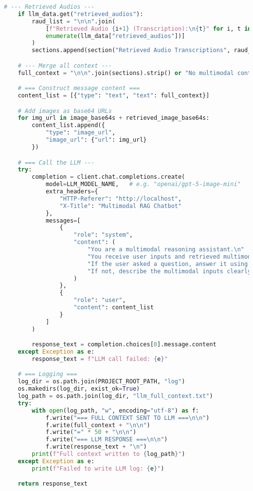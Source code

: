 \documentclass{article}
\begin{document}
\begin{latin}
\begin{lstlisting}[language=Python]
    # --- Retrieved Audios ---
    if llm_data.get("retrieved_audios"):
        raud_list = "\n\n".join(
            [f"Retrieved Audio {i+1} (Transcription):\n{t}" for i, t in
            enumerate(llm_data["retrieved_audios"])]
        )
        sections.append(section("Retrieved Audio Transcriptions", raud_list))

    # --- Merge all context ---
    full_context = "\n\n".join(sections).strip() or "No multimodal content provided."

    # === Construct message content ===
    content_list = [{"type": "text", "text": full_context}]

    # Add images as base64 URLs
    for img_url in image_base64s + retrieved_image_base64s:
        content_list.append({
            "type": "image_url",
            "image_url": {"url": img_url}
        })

    # === Call the LLM ---
    try:
        completion = client.chat.completions.create(
            model=LLM_MODEL_NAME, 	# e.g. "openai/gpt-5-image-mini"
            extra_headers={
                "HTTP-Referer": "http://localhost",
                "X-Title": "Multimodal RAG Chatbot"
            },
            messages=[
                {
                    "role": "system",
                    "content": (
                        "You are a multimodal reasoning assistant.\n"
                        "You receive user inputs and retrieved multimodal data (text, image, audio).\n"
                        "If the user asked a question, answer it using relevant data.\n"
                        "If not, describe the multimodal inputs clearly in Markdown."
                    )
                },
                {
                    "role": "user",
                    "content": content_list
                }
            ]
        )

        response_text = completion.choices[0].message.content
    except Exception as e:
        response_text = f"LLM call failed: {e}"

    # === Logging ===
    log_dir = os.path.join(PROJECT_ROOT_PATH, "log")
    os.makedirs(log_dir, exist_ok=True)
    log_path = os.path.join(log_dir, "llm_full_context.txt")
    try:
        with open(log_path, "w", encoding="utf-8") as f:
            f.write("=== FULL CONTEXT SENT TO LLM ===\n\n")
            f.write(full_context + "\n\n")
            f.write("=" * 50 + "\n\n")
            f.write("=== LLM RESPONSE ===\n\n")
            f.write(response_text + "\n")
        print(f"Full context written to {log_path}")
    except Exception as e:
        print(f"Failed to write LLM log: {e}")

    return response_text
\end{lstlisting}
\end{latin}
\end{document}
